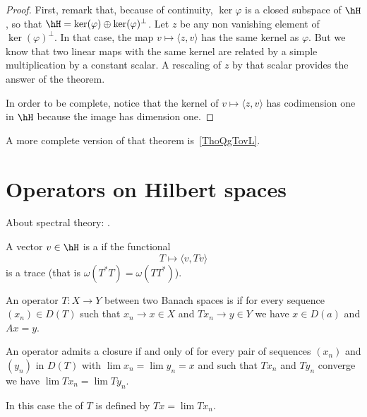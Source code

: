 \begin{proof}
First, remark that, because of continuity, $\ker\varphi$ is a closed subspace of $\hH$, so that $\hH=\ker(\varphi)\oplus\ker(\varphi)^{\perp}$. Let $z$ be any non vanishing element of $\ker(\varphi)^{\perp}$. In that case, the map $v\mapsto\langle z, v\rangle $ has the same kernel as $\varphi$. But we know that two linear maps with the same kernel are related by a simple multiplication by a constant scalar. A rescaling of $z$ by that scalar provides the answer of the theorem.

In order to be complete, notice that the kernel of $v\mapsto\langle z, v\rangle $ has codimension one in $\hH$ because the image has dimension one.
\end{proof}

A more complete version of that theorem is~\ref{ThoQgTovL}.

\section{Operators on Hilbert spaces}
About spectral theory: \cite{AndrewGreen}.

\begin{definition}	\label{DefVecteurTrace}
	A vector $v\in\hH$ is a  if the functional
	\begin{equation}
		T\mapsto\langle v, Tv\rangle
	\end{equation}
	is a trace (that is $\omega(T^*T)=\omega(TT^*)$).
\end{definition}

\begin{definition}
    An operator \(T\colon X\to Y\) between two Banach spaces is  if for every sequence \( (x_n)\in D(T)\) such that \(x_n\to x\in X\) and \(Tx_n\to y\in Y\) we have \(x\in D(a)\) and \(Ax=y\).
\end{definition}

\begin{proposition}     \label{PropoOpFermableLim}
    An operator admits a closure if and only of for every pair of sequences \( (x_n)\) and \( (y_n)\) in \(D(T)\) with \(\lim x_n=\lim y_n=x\) and such that \(Tx_n\) and \(Ty_n\) converge we have \(\lim Tx_n=\lim Ty_n\).
\end{proposition}

In this case the  of \(T\) is defined by \( Tx=\lim Tx_n \).

